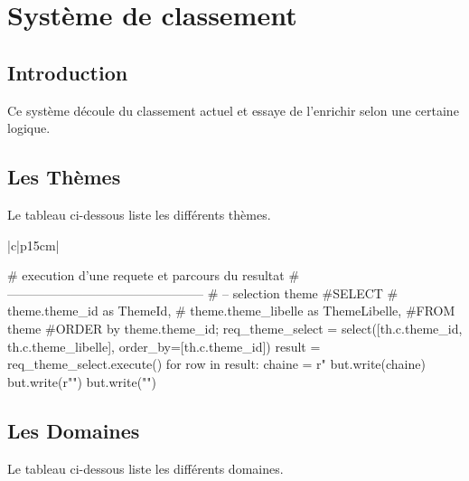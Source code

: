 \documentclass[12pt,titlepage,oneside]{book}
\begin{document}
\chapter{Système de classement}

\section{Introduction}
Ce système découle du classement actuel et essaye de l'enrichir selon une certaine logique.

\section{Les Thèmes}
Le tableau ci-dessous liste les différents thèmes.
\vspace{\baselineskip}

\renewcommand{\arraystretch}{1.2}
\begin{supertabular}{|c|p{15cm}|}

\begin{lbdpython}
# execution d'une requete et parcours du resultat
# -----------------------------------------------
# -- selection theme
#SELECT
#   theme.theme_id as ThemeId,
#   theme.theme_libelle as ThemeLibelle,
#FROM theme
#ORDER by theme.theme_id;
req_theme_select = select([th.c.theme_id, th.c.theme_libelle],
                           order_by=[th.c.theme_id])
result = req_theme_select.execute()
for row in result:
  chaine = r"%
  but.write(chaine)
  but.write(r"\hline")
  but.write("\n")

\end{lbdpython}
\end{supertabular}


\section{Les Domaines}
Le tableau ci-dessous liste les différents domaines.
\vspace{\baselineskip}
\end{document}
